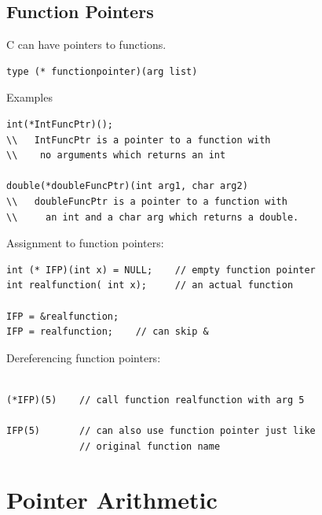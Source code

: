 
\subsection{Function Pointers}

C can have pointers to functions.

\begin{verbatim}
type (* functionpointer)(arg list)
\end{verbatim}
Examples
\begin{verbatim}
int(*IntFuncPtr)();
\\   IntFuncPtr is a pointer to a function with
\\    no arguments which returns an int

double(*doubleFuncPtr)(int arg1, char arg2)
\\   doubleFuncPtr is a pointer to a function with
\\     an int and a char arg which returns a double.
\end{verbatim}


Assignment to function pointers:

\begin{verbatim}
int (* IFP)(int x) = NULL;    // empty function pointer
int realfunction( int x);     // an actual function

IFP = &realfunction;
IFP = realfunction;    // can skip &
\end{verbatim}


Dereferencing function pointers:

\begin{verbatim}

(*IFP)(5)    // call function realfunction with arg 5

IFP(5)       // can also use function pointer just like
             // original function name
\end{verbatim}



\section{Pointer Arithmetic}

